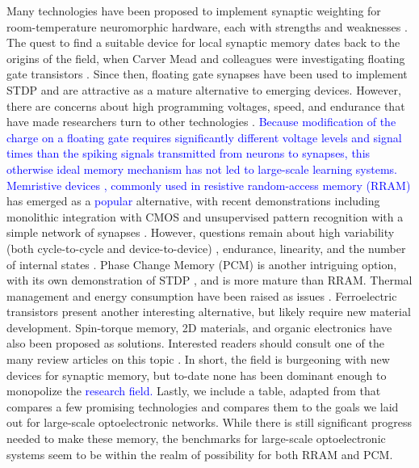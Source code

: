 \documentclass[twocolumn]{article}
\begin{document}
Many technologies have been proposed to implement synaptic weighting for room-temperature neuromorphic hardware, each with strengths and weaknesses \cite{upadhyay2019emerging}. The quest to find a suitable device for local synaptic memory dates back to the origins of the field, when Carver Mead and colleagues were investigating floating gate transistors \cite{diorio1998floating}. Since then, floating gate synapses have been used to implement STDP \cite{ramakrishnan2011floating} and are attractive as a mature alternative to emerging devices. However, there are concerns about high programming voltages, speed, and endurance that have made researchers turn to other technologies \cite{zahoor2020resistive}. \textcolor{blue}{Because modification of the charge on a floating gate requires significantly different voltage levels and signal times than the spiking signals transmitted from neurons to synapses, this otherwise ideal memory mechanism has not led to large-scale learning systems. Memristive devices \cite{stsn2008,yast2012,ab2018}, commonly used in resistive random-access memory (RRAM)} has emerged as a \textcolor{blue}{popular} alternative, with recent demonstrations including monolithic integration with CMOS \cite{yin2019monolithically} and unsupervised pattern recognition with a simple network of synapses \cite{ielmini2018brain}. However, questions remain about high variability (both cycle-to-cycle and device-to-device) \cite{dalgaty2019hybrid}, endurance, linearity, and the number of internal states \cite{zahoor2020resistive}. Phase Change Memory (PCM) is another intriguing option, with its own demonstration of STDP \cite{ambrogio2016unsupervised}, and is more mature than RRAM. Thermal management and energy consumption have been raised as issues \cite{upadhyay2019emerging, zahoor2020resistive}. Ferroelectric transistors present another interesting alternative, but likely require new material development. Spin-torque memory, 2D materials, and organic electronics have also been proposed as solutions. Interested readers should consult one of the many review articles on this topic \cite{kim2018recent, upadhyay2019emerging, zhang2020brain}. In short, the field is burgeoning with new devices for synaptic memory, but to-date none has been dominant enough to monopolize the \textcolor{blue}{research field.} Lastly, we include a table, adapted from \cite{zahoor2020resistive} that compares a few promising technologies and compares them to the goals we laid out for large-scale optoelectronic networks. While there is still significant progress needed to make these memory, the benchmarks for large-scale optoelectronic systems seem to be within the realm of possibility for both RRAM and PCM.
\end{document}
